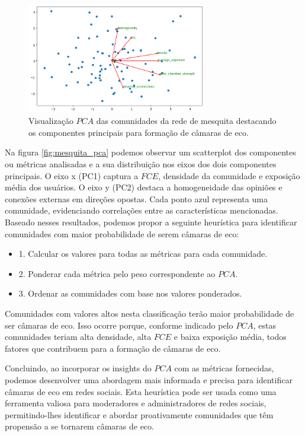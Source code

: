 \begin{figure}[htb]
	\centering
	\includegraphics[width=0.7\textwidth]{images/mesquita_pca.png}
	\caption{Visualização $PCA$ das comunidades da rede de mesquita destacando os componentes principais para formação de câmaras de eco.}
	\label{fig:mesquita_pca}
\end{figure}

Na figura \autoref{fig:mesquita_pca} podemos observar um scatterplot dos componentes ou métricas analisadas e a sua distribuição nos eixos dos dois componentes principais. O eixo x (PC1) captura a $FCE$, densidade da comunidade e exposição média dos usuários. O eixo y (PC2) destaca a homogeneidade das opiniões e conexões externas em direções opostas. Cada ponto azul representa uma comunidade, evidenciando correlações entre as características mencionadas. Baseado nesses resultados, podemos propor a seguinte heurística para identificar comunidades com maior probabilidade de serem câmaras de eco:

\begin{itemize}
	\item 1. Calcular os valores para todas as métricas para cada comunidade.
	\item 2. Ponderar cada métrica pelo peso correspondente ao $PCA$.
	\item 3. Ordenar as comunidades com base nos valores ponderados.
\end{itemize}

Comunidades com valores altos nesta classificação terão maior probabilidade de ser câmaras de eco. Isso ocorre porque, conforme indicado pelo $PCA$, estas comunidades teriam alta densidade, alta $FCE$ e baixa exposição média, todos fatores que contribuem para a formação de câmaras de eco.

Concluindo, ao incorporar os insights do $PCA$ com as métricas fornecidas, podemos desenvolver uma abordagem mais informada e precisa para identificar câmaras de eco em redes sociais. Esta heurística pode ser usada como uma ferramenta valiosa para moderadores e administradores de redes sociais, permitindo-lhes identificar e abordar proativamente comunidades que têm propensão a se tornarem câmaras de eco.

